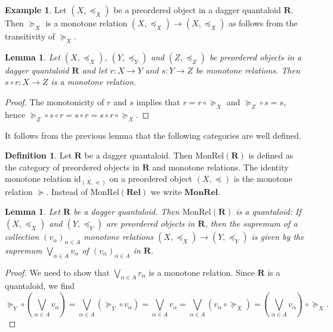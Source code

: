 \documentclass[12pt]{tac}
\newtheorem{lemma}[theorem]{Lemma}
\theoremstyle{definition}
\newtheorem{definition}[theorem]{Definition}
\newtheorem{example}[theorem]{Example}
\theoremstyle{remark}
\newcommand{\qo}{{\boldsymbol{\preccurlyeq}}}
\newcommand{\qop}{{\boldsymbol{\succcurlyeq}}}
\newcommand{\qedhere}{}
\newcommand{\<}{\langle}
\renewcommand{\>}{\rangle}
\renewcommand{\:}{\colon}
\newcommand{\id}{\mathrm{id}}
\begin{document}
\begin{example}
    Let $(X,\qo_X)$ be a preordered object in a dagger quantaloid $\mathbf R$. Then $\qop_X$ is a monotone relation $(X,\qo_X)\to(X,\qo_X)$ as follows from the transitivity of $\qop_X$. 
\end{example}


\begin{lemma}\label{lem:composition monotone relations}
    Let $(X,\qo_X)$, $(Y,\qo_Y)$ and $(Z,\qo_Z)$ be preordered objects in a dagger quantaloid $\mathbf R$ and let $r:X\to Y$ and $s:Y\to Z$ be monotone relations. Then $s\circ r:X\to Z$ is a monotone relation.
    \end{lemma}
\begin{proof}The monotonicity of $r$ and $s$ implies that $r=r\circ\qop_X$ and $\qop_Z\circ s=s$, hence $\qop_Z\circ s\circ r=s\circ r=s\circ r\circ\qop_X$. 
\end{proof}


It follows from the previous lemma that the following categories are well defined.
\begin{definition}Let $\mathbf R$ be a dagger quantaloid. Then $\mathrm{MonRel}(\mathbf R)$ is defined as the category of preordered objects in $\mathbf R$ and monotone relations. The identity monotone relation  $\id_{(X,\qo)}$ on a preordered object $(X,\qo)$ is the monotone relation $\qop$. Instead of $\mathrm{MonRel}(\mathbf{Rel})$ we write $\mathbf{MonRel}$.
\end{definition}


\begin{lemma}\label{lem:MonRel is quantaloid}
Let $\mathbf R$ be a dagger quantaloid. Then $\mathrm{MonRel}(\mathbf R)$ is a quantaloid: If $(X,\qo_X)$ and $(Y,\qo_Y)$ are preordered objects in $\mathbf R$, then the supremum of a collection $(v_\alpha)_{\alpha\in A}$ monotone relations $(X,\qo_X)\to (Y,\qo_Y)$ is given by the supremum $\bigvee_{\alpha\in A}v_\alpha$ of $(v_\alpha)_{\alpha\in A}$ in $\mathbf R$. 
\end{lemma}
\begin{proof}
We need to show that $\bigvee_{\alpha\in A}r_\alpha$ is a monotone relation. Since $\mathbf R$ is a quantaloid, we find 
    \[ \qop_Y\circ\left(\bigvee_{\alpha\in A}v_\alpha\right)=\bigvee_{\alpha\in A}(\qop_Y\circ v_\alpha)=\bigvee_{\alpha\in A}v_\alpha=\bigvee_{\alpha\in A}(v_\alpha\circ\qop_X)=\left(\bigvee_{\alpha\in A}v_\alpha\right)\circ\qop_X.\qedhere\]
\end{proof}
\end{document}
